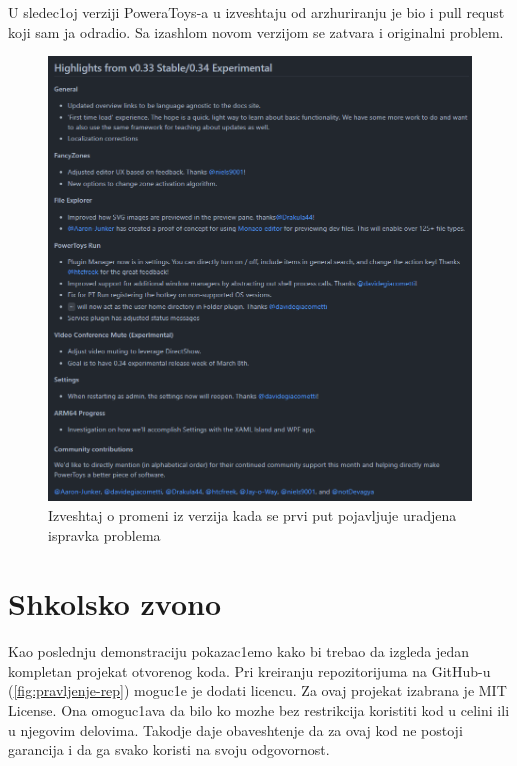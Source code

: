 \documentclass[a4paper,fleqn,12pt]{JMThesis}
\newcommand{\latin}{\fontencoding{T1}\selectfont}
\theoremstyle{plain}
\theoremstyle{definition}
\begin{document}
U sledec1oj verziji {\latin PoweraToys}-a u izveshtaju od arzhuriranju je bio i {\latin pull requst} koji sam ja odradio. Sa izashlom novom verzijom se zatvara i originalni problem.
\begin{figure}[H]
    \centering
    \includegraphics[scale=0.5]{izvestaj.png}
    \caption{Izveshtaj o promeni iz verzija kada se prvi put pojavljuje uradjena ispravka problema}
    \label{fig:izvestaj}
\end{figure}

\chapter[Shkolsko zvono]{Shkolsko zvono}
Kao poslednju demonstraciju pokazac1emo kako bi trebao da izgleda jedan kompletan projekat otvorenog koda. 
Pri kreiranju repozitorijuma na {\latin GitHub}-u (\ref{fig:pravljenje-rep}) moguc1e je dodati licencu. 
Za ovaj projekat izabrana je {\latin MIT License}. 
Ona omoguc1ava da bilo ko mozhe bez restrikcija koristiti kod u celini ili u njegovim delovima. 
Takodje daje obaveshtenje da za ovaj kod ne postoji garancija i da ga svako koristi na svoju odgovornost.\\
\end{document}
